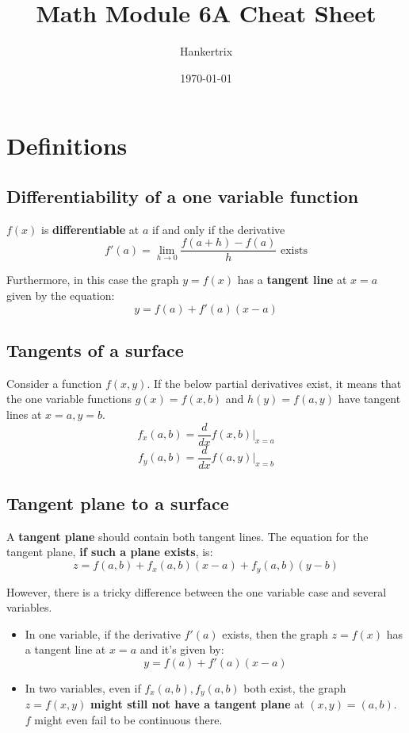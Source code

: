 \documentclass[11pt]{article}
\author{Hankertrix}
\date{\today}
\title{Math Module 6A Cheat Sheet}
\begin{document}
\maketitle
\setcounter{tocdepth}{2}
\tableofcontents \clearpage
\section{Definitions}
\label{sec:org53c13e1}

\subsection{Differentiability of a one variable function}
\label{sec:org2907547}
\(f(x)\) is \textbf{differentiable} at \(a\) if and only if the derivative
\[f'(a) = \lim_{h \rightarrow 0} \frac{f(a + h) - f(a)}{h} \text{ exists}\]

Furthermore, in this case the graph \(y = f(x)\) has a \textbf{tangent line} at \(x = a\) given by the equation:
\[y = f(a) + f'(a) (x - a)\]

\subsection{Tangents of a surface}
\label{sec:org64933ef}
Consider a function \(f(x, y)\). If the below partial derivatives exist, it means that the one variable functions \(g(x) = f(x, b)\) and \(h(y) = f(a, y)\) have tangent lines at \(x = a, y = b\).
\[f_x(a, b) = \frac{d}{dx}f(x, b)|_{x = a}\]
\[f_y(a, b) = \frac{d}{dx}f(a, y)|_{x = b}\]

\subsection{Tangent plane to a surface}
\label{sec:org8bcc04a}
A \textbf{tangent plane} should contain both tangent lines. The equation for the tangent plane, \textbf{if such a plane exists}, is:
\[z = f(a, b) + f_x (a, b)(x - a) + f_y(a, b)(y - b)\]

However, there is a tricky difference between the one variable case and several variables.
\begin{itemize}
\item In one variable, if the derivative \(f'(a)\) exists, then the graph \(z = f(x)\) has a tangent line at \(x = a\) and it's given by:
\[y = f(a) + f'(a) (x - a)\]
\item In two variables, even if \(f_x(a, b), f_y(a, b)\) both exist, the graph \(z = f(x, y)\) \textbf{might still not have a tangent plane} at \((x, y) = (a, b)\). \(f\) might even fail to be continuous there.
\end{itemize}
\end{document}
